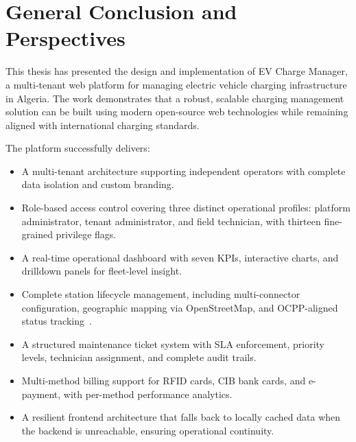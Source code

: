 \documentclass[12pt,a4paper]{report}
\begin{document}

\chapter*{General Conclusion and Perspectives}

This thesis has presented the design and implementation of EV Charge Manager, a multi-tenant
web platform for managing electric vehicle charging infrastructure in Algeria. The work
demonstrates that a robust, scalable charging management solution can be built using modern
open-source web technologies while remaining aligned with international charging standards.

The platform successfully delivers:

\begin{itemize}
  \item A multi-tenant architecture supporting independent operators with complete data isolation
        and custom branding.

  \item Role-based access control covering three distinct operational profiles: platform
        administrator, tenant administrator, and field technician, with thirteen fine-grained
        privilege flags.

  \item A real-time operational dashboard with seven KPIs, interactive charts, and drilldown
        panels for fleet-level insight.

  \item Complete station lifecycle management, including multi-connector configuration,
        geographic mapping via OpenStreetMap, and OCPP-aligned status tracking~\autocite{ocpp16_ed2}.

  \item A structured maintenance ticket system with SLA enforcement, priority levels, technician
        assignment, and complete audit trails.

  \item Multi-method billing support for RFID cards, CIB bank cards, and e-payment, with
        per-method performance analytics.

  \item A resilient frontend architecture that falls back to locally cached data when the backend
        is unreachable, ensuring operational continuity.
\end{itemize}
\end{document}
